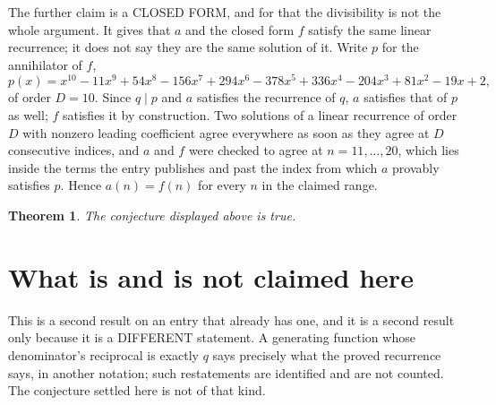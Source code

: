 \documentclass[11pt,a4paper]{article}
\theoremstyle{plain}
\newtheorem{theorem}{Theorem}
\theoremstyle{definition}
\begin{document}
The further claim is a CLOSED FORM, and for that the divisibility is not the whole argument. It
gives that $a$ and the closed form $f$ satisfy the same linear recurrence; it does not say they
are the same solution of it. Write $p$ for the annihilator of $f$,
\[
  p(x)=x^{10} - 11 x^{9} + 54 x^{8} - 156 x^{7} + 294 x^{6} - 378 x^{5} + 336 x^{4} - 204 x^{3} + 81 x^{2} - 19 x + 2 ,
\]
of order $D=10$. Since $q\mid p$ and $a$ satisfies the recurrence of $q$, $a$ satisfies that of
$p$ as well; $f$ satisfies it by construction. Two solutions of a linear recurrence of order $D$
with nonzero leading coefficient agree everywhere as soon as they agree at $D$ consecutive
indices, and $a$ and $f$ were checked to agree at $n=11,\dots,20$,
which lies inside the terms the entry publishes and past the index from which $a$ provably
satisfies $p$. Hence $a(n)=f(n)$ for every $n$ in the claimed range.

\begin{theorem}
The conjecture displayed above is true.
\end{theorem}

\section{What is and is not claimed here}

This is a second result on an entry that already has one, and it is a second result only because
it is a DIFFERENT statement. A generating function whose denominator's reciprocal is exactly $q$
says precisely what the proved recurrence says, in another notation; such restatements are
identified and are not counted. The conjecture settled here is not of that kind.
\end{document}
